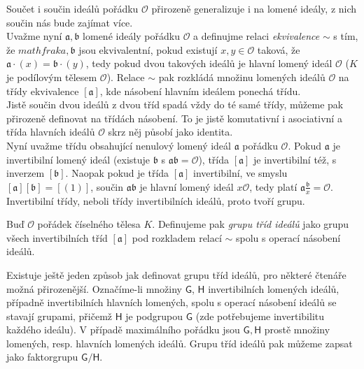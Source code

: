 \documentclass [12pt]{report}
\begin{document}
Součet i součin ideálů pořádku $\mathcal{O}$ přirozeně generalizuje i na lomené ideály, z nich součin nás bude zajímat více.\\

Uvažme nyní $\mathfrak{a},\mathfrak{b}$ lomené ideály pořádku $\mathcal{O}$ a definujme relaci \textit{ekvivalence} $\sim$ s tím, že $mathfrak{a},\mathfrak{b}$ jsou ekvivalentní, pokud existují $x,y \in \mathcal{O}$ taková, že $\mathfrak{a} \cdot (x) = \mathfrak{b} \cdot (y)$, tedy pokud  dvou takových ideálů je hlavní lomený ideál $\mathcal{O}$ ($K$ je podílovým tělesem $\mathcal{O}$). Relace $\sim$ pak rozkládá množinu lomených ideálů $\mathcal{O}$ na třídy ekvivalence $[\mathfrak{a}]$, kde násobení hlavním ideálem ponechá třídu.\\

Jistě součin dvou ideálů z dvou tříd spadá vždy do té samé třídy, můžeme pak přirozeně definovat na třídách násobení. To je jistě komutativní i asociativní a třída hlavních ideálů $\mathcal{O}$ skrz něj působí jako identita.\\

Nyní uvažme třídu obsahující nenulový lomený ideál $\mathfrak{a}$ pořádku $\mathcal{O}$. Pokud $\mathfrak{a}$ je invertibilní lomený ideál (existuje $\mathfrak{b}$ s $\mathfrak{ab} = \mathcal{O}$), třída $[\mathfrak{a}]$ je invertibilní též, s inverzem $[\mathfrak{b}]$. Naopak pokud je třída $[\mathfrak{a}]$ invertibilní, ve smyslu $[\mathfrak{a}][\mathfrak{b}] = [(1)]$, součin $\mathfrak{a}\mathfrak{b}$ je hlavní lomený ideál $x\mathcal{O}$, tedy platí $\mathfrak{a} \frac{\mathfrak{b}}{x} = \mathcal{O}$. Invertibilní třídy, neboli třídy invertibilních ideálů, proto tvoří grupu. 

\begin{definice}
Buď $\mathcal{O}$ pořádek číselného tělesa $K$. Definujeme pak \textit{grupu tříd ideálů} jako grupu všech invertibilních tříd $[\mathfrak{a}]$ pod rozkladem relací $\sim$ spolu s operací násobení ideálů.
\end{definice}

Existuje ještě jeden způsob jak definovat grupu tříd ideálů, pro některé čtenáře možná přirozenější. Označíme-li množiny $\mathsf{G}$, $\mathsf{H}$ invertibilních lomených ideálů, případně invertibilních hlavních lomených, spolu s operací násobení ideálů se stavají grupami, přičemž $\mathsf{H}$ je podgrupou $\mathsf{G}$ (zde potřebujeme invertibilitu každého ideálu). V případě maximálního pořádku jsou $\mathsf{G},\mathsf{H}$ prostě množiny lomených, resp. hlavních lomených ideálů. Grupu tříd ideálů pak můžeme zapsat jako faktorgrupu $\mathsf{G}/\mathsf{H}$.\\
\end{document}
